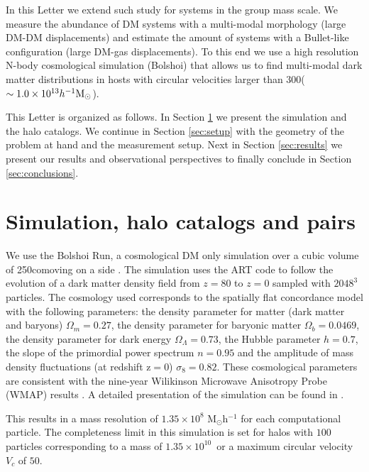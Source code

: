 \documentclass{emulateapj}
\newcommand{\hMpc}{{\ifmmode{h^{-1}{\rm Mpc}}\else{$h^{-1}$Mpc }\fi}}
\newcommand{\hMsun}{{\ifmmode{h^{-1}{\rm {M_{\odot}}}}\else{$h^{-1}{\rm{M_{\odot}}}$}\fi}}
\newcommand{\kms}{{\ifmmode{{\mathrm{\,km\ s}^{-1}}}\else{\,km~s$^{-1}$}\fi}}
\begin{document}
In this Letter we extend such study for systems in the group mass
scale. We measure the abundance of DM systems with a multi-modal
morphology (large DM-DM displacements) and estimate the amount of
systems with a Bullet-like configuration  (large DM-gas
displacements). To this end we use a high resolution N-body
cosmological simulation (Bolshoi) that allows us to find multi-modal
dark matter distributions in hosts with circular velocities larger
than $300$\kms ($\sim 1.0\times 10^{13}\hMsun$).

This Letter is organized as follows. In Section
\ref{sec:simulation} we present the simulation and the halo
catalogs. We continue in Section \ref{sec:setup} with the  geometry of
the problem at hand and the measurement setup. Next in   Section
\ref{sec:results} we present our results and observational
perspectives to finally conclude in Section \ref{sec:conclusions}.  

\section{Simulation, halo catalogs and pairs}
\label{sec:simulation}

We use the Bolshoi Run, a cosmological DM only simulation over a cubic
volume of 250\hMpc comoving on a side \citep{2011ApJ...740..102K}. The
simulation uses the ART code \citep{Kravtsov1997} to follow the
evolution of a dark matter density field from $z=80$ to $z=0$ sampled
with $2048^3$  particles. The cosmology used  corresponds to  the
spatially flat concordance model with the following parameters:  the
density parameter for matter (dark matter and baryons)
$\Omega_m=0.27$, the density parameter for baryonic matter
$\Omega_b=0.0469$, the density parameter for dark energy
$\Omega_{\Lambda}=0.73$, the Hubble parameter $h=0.7$, the slope of
the primordial power spectrum $n=0.95$ and the amplitude of mass
density fluctuations (at redshift z$=$0) $\sigma_8=0.82$.  These
cosmological parameters are consistent with the nine-year Wilikinson
Microwave Anisotropy Probe (WMAP) results \citep{hinshaw_etal13}. A
detailed presentation of the simulation can be found in
\citet{2011ApJ...740..102K}.  

This results in a mass resolution of $1.35 \times 10^8$
M$_{\odot}$h$^{-1}$ for each computational particle. The completeness
limit in this simulation is set for halos with $100$ particles
corresponding to a mass of $1.35\times10^{10}$\hMsun\ or a maximum
circular velocity $V_{c}$ of $50$\kms. 
\end{document}
